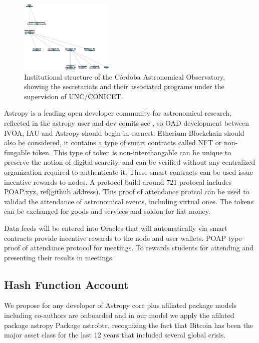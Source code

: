 \documentclass[final,5p,times,twocolumn,authoryear]{elsarticle}
\begin{document}
\begin{figure}[h]
    \centering
    \includegraphics[width=0.4\textwidth]{figs/institutional_structure_v2.eps}
    \caption{Institutional structure of the Córdoba Astronomical Observatory, showing the secretariats and their associated programs under the supervision of UNC/CONICET.}
    \label{fig:institutional_structure}
\end{figure}


Astropy is a leading open developer community for astronomical research, reflected in the astropy  user and dev comits see \cite{ 2020ASPC..522..491T}, so OAD development between IVOA, IAU and Astropy should begin in earnest. Etherium Blockchain should also be considered, it contains a type of smart contracts called NFT or non-fungable token.  This type of token is non-interchangable can be unique to preserve the notion of digital scarcity, and can be verified without any centralized organization required to authenticate it. These smart contracts can be used issue incentive rewards to nodes. A protocol build around 721 protocal includes POAP.xyz, ref(github address). This proof of attendance protcol can be used to validad the attendance of astronomical events, including virtual ones. The tokens can be exchanged for goods and services and soldon for fiat money.  


Data feeds will be entered into Oracles that will automatically via smart contracts provide incentive rewards to the node and user wallets.
%
POAP type proof of attendance protocol for meetings. To rewards students for attending and presenting their results in meetings.
%
\subsection{Hash Function Account}
We propose for any developer of Astropy core plus afiliated package models including co-authors are onboarded and in our model we apply the afilated package astropy Package astrobtc, recognizing the fact that Bitcoin has been the major asset class for the last 12 years that included several global crisis. 
%
\end{document}
